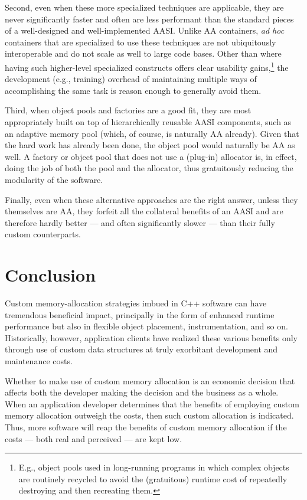 Second, even when these more specialized techniques are applicable, they are never
significantly faster and often are less performant than the standard pieces of a
well-designed and well-implemented AASI. Unlike AA containers, \emph{ad hoc} containers that
are specialized to use these techniques are not ubiquitously interoperable and do
not scale as well to large code bases. Other than where having such higher-level
specialized constructs offers clear usability gains,\footnote{E.g., object pools used in long-running programs in which complex objects are routinely recycled to
avoid the (gratuitous) runtime cost of repeatedly destroying and then recreating them.}
the development (e.g., training)
overhead of maintaining multiple ways of accomplishing the same task is reason
enough to generally avoid them.

Third, when object pools and factories are a good fit, they are most appropriately
built on top of hierarchically reusable AASI components, such as an adaptive
memory pool (which, of course, is naturally AA already). Given that the hard work
has already been done, the object pool would naturally be AA as well. A factory or
object pool that does not use a (plug-in) allocator is, in effect, doing the job of both
the pool and the allocator, thus gratuitously reducing the modularity of the
software.

Finally, even when these alternative approaches are the right answer, unless they
themselves are AA, they forfeit all the collateral benefits of an AASI and are therefore
hardly better — and often significantly slower — than their fully custom
counterparts.

\section{Conclusion}
Custom memory-allocation strategies imbued in C++ software can have tremendous
beneficial impact, principally in the form of enhanced runtime performance but also
in flexible object placement, instrumentation, and so on. Historically, however,
application clients have realized these various benefits only through use of custom
data structures at truly exorbitant development and maintenance costs.

Whether to make use of custom memory allocation is an economic decision that
affects both the developer making the decision and the business as a whole. When
an application developer determines that the benefits of employing custom memory
allocation outweigh the costs, then such custom allocation is indicated. Thus, more
software will reap the benefits of custom memory allocation if the costs — both real
and perceived — are kept low.

